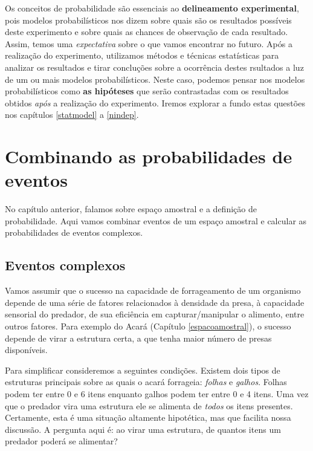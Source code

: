 \documentclass[
]{book}
\begin{document}
Os conceitos de probabilidade são essenciais ao \textbf{delineamento experimental}, pois modelos probabilísticos nos dizem sobre quais são os resultados possíveis deste experimento e sobre quais as chances de observação de cada resultado. Assim, temos uma \emph{expectativa} sobre o que vamos encontrar no futuro. Após a realização do experimento, utilizamos métodos e técnicas estatísticas para analizar os resultados e tirar concluções sobre a ocorrência destes rsultados a luz de um ou mais modelos probabilísticos. Neste caso, podemos pensar nos modelos probabilísticos como \textbf{as hipóteses} que serão contrastadas com os resultados obtidos \emph{após} a realização do experimento. Iremos explorar a fundo estas questões nos capítulos \ref{statmodel} a \ref{nindep}.

\hypertarget{probregras}{%
\chapter{Combinando as probabilidades de eventos}\label{probregras}}

No capítulo anterior, falamos sobre espaço amostral e a definição de probabilidade. Aqui vamos combinar eventos de um espaço amostral e calcular as probabilidades de eventos complexos.

\hypertarget{eventos-complexos}{%
\section{Eventos complexos}\label{eventos-complexos}}

Vamos assumir que o sucesso na capacidade de forrageamento de um organismo depende de uma série de fatores relacionados à densidade da presa, à capacidade sensorial do predador, de sua eficiência em capturar/manipular o alimento, entre outros fatores. Para exemplo do Acará (Capítulo \ref{espacoamostral}), o sucesso depende de virar a estrutura certa, a que tenha maior número de presas disponíveis.

Para simplificar consideremos a seguintes condições. Existem dois tipos de estruturas principais sobre as quais o acará forrageia: \emph{folhas} e \emph{galhos}. Folhas podem ter entre 0 e 6 itens enquanto galhos podem ter entre 0 e 4 itens. Uma vez que o predador vira uma estrutura ele se alimenta de \emph{todos} os itens presentes. Certamente, esta é uma situação altamente hipotética, mas que facilita nossa discussão. A pergunta aqui é: ao virar uma estrutura, de quantos itens um predador poderá se alimentar?
\end{document}
